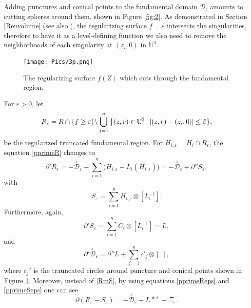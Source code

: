 \documentclass[a4paper,11pt]{article}
\newcommand{\SchottkyFund}{\mathcal{D}}
\newcommand{\singfund}{\overset{{}_{\curlywedge}}{\mathcal{D}}}
\begin{document}
Adding punctures and conical points to the fundamental domain $\SchottkyFund$, amounts to cutting spheres around them, shown in Figure \ref{fig:2}. As demonstrated in Section \ref{Renvolume} (see also \cite{park2017potentials}), the regularizing surface $f=\varepsilon$   intersects the singularities, therefore to have it as a level-defining function we also need to remove the neighborhoods of each singularity at $(z_i,0)$ in $\mathbb{U}^3$.
\begin{figure}[h]
\centering
\texttt{[image: Pics/3p.png]}
\caption{The regularizing surface $f(Z)$ which cuts through the fundamental region.}
\label{fig:3}
\end{figure}
For $\varepsilon>0$, let
\begin{equation}
R_{\varepsilon} = R\cap\{f\geq\varepsilon\}\backslash \bigcup_{j=1}^{n}\big{\{}(z,r)\in\mathbb{U}^3\big| ~|(z,r)-(z_i,0)| \leq \tilde{\varepsilon}\big{\}},
\end{equation}
be the regularized truncated fundamental region. For $H_{i,\varepsilon}= H_i\cap R_{\varepsilon}$, the equation \eqref{pprimeR} changes to
\begin{equation}
\partial' R_\varepsilon = -\singfund_{\varepsilon}- \sum_{i=1}^{g} \big(H_{i,\varepsilon} -L_i(H_{i,\varepsilon})\big) = -\singfund_{\varepsilon} + \partial'' S_{\varepsilon},\label{pprimeReps}
\end{equation}
with 
\begin{equation}
S_\varepsilon = \sum_{i=1}^{g} H_{i,\varepsilon} \otimes [L_i^{-1}].
\end{equation}
Furthermore, again, 
\begin{equation}
\partial'S_\varepsilon  = \sum_{i=1}^{g} C_i \otimes [L_i^{-1}] = L,\label{pprimeSeps}
\end{equation}
and 
\begin{equation}
\partial' \singfund_{\varepsilon} 
=\partial'' L  + \sum_{j=1}^{n} c'_j\otimes [\;],\label{parD}
\end{equation}
where $c_j'$ is the trauncated circles around puncture and conical points shown in Figure \ref{fig:3}. Moreover, instead of \eqref{RmS}, by using equations \eqref{pprimeReps} and \eqref{pprimeSeps} one can see
\begin{equation}
\partial (R_{\varepsilon}-S_{\varepsilon}) = -\singfund_{\varepsilon}  -L\overset{\text{def}}{=}-\Xi_{\varepsilon}.\label{RmSeps}
\end{equation} 
\end{document}
